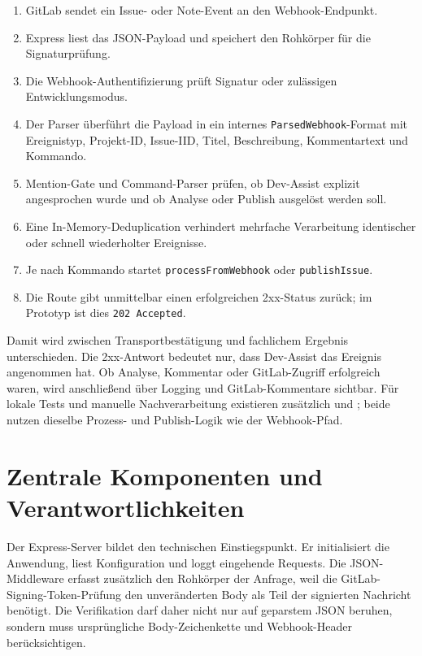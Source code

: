 \documentclass[12pt,a4paper,oneside]{scrreprt}
\begin{document}
\begin{enumerate}
\item GitLab sendet ein Issue- oder Note-Event an den Webhook-Endpunkt.
\item Express liest das JSON-Payload und speichert den Rohkörper für die Signaturprüfung.
\item Die Webhook-Authentifizierung prüft Signatur oder zulässigen Entwicklungsmodus.
\item Der Parser überführt die Payload in ein internes \texttt{ParsedWebhook}-Format mit Ereignistyp, Projekt-ID, Issue-IID, Titel, Beschreibung, Kommentartext und Kommando.
\item Mention-Gate und Command-Parser prüfen, ob Dev-Assist explizit angesprochen wurde und ob Analyse oder Publish ausgelöst werden soll.
\item Eine In-Memory-Deduplication verhindert mehrfache Verarbeitung identischer oder schnell wiederholter Ereignisse.
\item Je nach Kommando startet \texttt{processFromWebhook} oder \texttt{publishIssue}.
\item Die Route gibt unmittelbar einen erfolgreichen 2xx-Status zurück; im Prototyp ist dies \texttt{202 Accepted}.
\end{enumerate}

Damit wird zwischen Transportbestätigung und fachlichem Ergebnis unterschieden. Die 2xx-Antwort bedeutet nur, dass Dev-Assist das Ereignis angenommen hat. Ob Analyse, Kommentar oder GitLab-Zugriff erfolgreich waren, wird anschließend über Logging und GitLab-Kommentare sichtbar. Für lokale Tests und manuelle Nachverarbeitung existieren zusätzlich  und ; beide nutzen dieselbe Prozess- und Publish-Logik wie der Webhook-Pfad.

\section{Zentrale Komponenten und Verantwortlichkeiten}

Der Express-Server bildet den technischen Einstiegspunkt. Er initialisiert die Anwendung, liest Konfiguration und loggt eingehende Requests. Die JSON-Middleware erfasst zusätzlich den Rohkörper der Anfrage, weil die GitLab-Signing-Token-Prüfung den unveränderten Body als Teil der signierten Nachricht benötigt. Die Verifikation darf daher nicht nur auf geparstem JSON beruhen, sondern muss ursprüngliche Body-Zeichenkette und Webhook-Header berücksichtigen.
\end{document}
